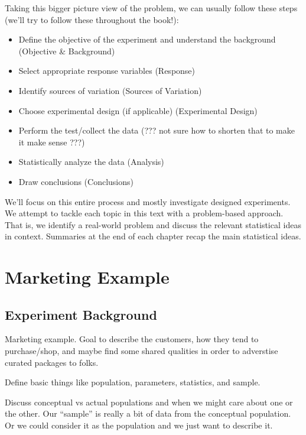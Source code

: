 \documentclass[
]{book}
\providecommand{\tightlist}{%
  \setlength{\itemsep}{0pt}\setlength{\parskip}{0pt}}
\theoremstyle{definition}
\theoremstyle{definition}
\theoremstyle{definition}
\theoremstyle{remark}
\begin{document}
Taking this bigger picture view of the problem, we can usually follow these steps (we'll try to follow these throughout the book!):

\begin{itemize}
\tightlist
\item
  Define the objective of the experiment and understand the background (Objective \& Background)\\
\item
  Select appropriate response variables (Response)\\
\item
  Identify sources of variation (Sources of Variation)\\
\item
  Choose experimental design (if applicable) (Experimental Design)\\
\item
  Perform the test/collect the data (??? not sure how to shorten that to make it make sense ???)
\item
  Statistically analyze the data (Analysis)\\
\item
  Draw conclusions (Conclusions)
\end{itemize}

We'll focus on this entire process and mostly investigate designed experiments. We attempt to tackle each topic in this text with a problem-based approach. That is, we identify a real-world problem and discuss the relevant statistical ideas in context. Summaries at the end of each chapter recap the main statistical ideas.

\hypertarget{marketing-example}{%
\section{Marketing Example}\label{marketing-example}}

\hypertarget{experiment-background}{%
\subsection{Experiment Background}\label{experiment-background}}

Marketing example. Goal to describe the customers, how they tend to purchase/shop, and maybe find some shared qualities in order to adverstise curated packages to folks.

Define basic things like population, parameters, statistics, and sample.

Discuss conceptual vs actual populations and when we might care about one or the other. Our ``sample'' is really a bit of data from the conceptual population. Or we could consider it as the population and we just want to describe it.
\end{document}
